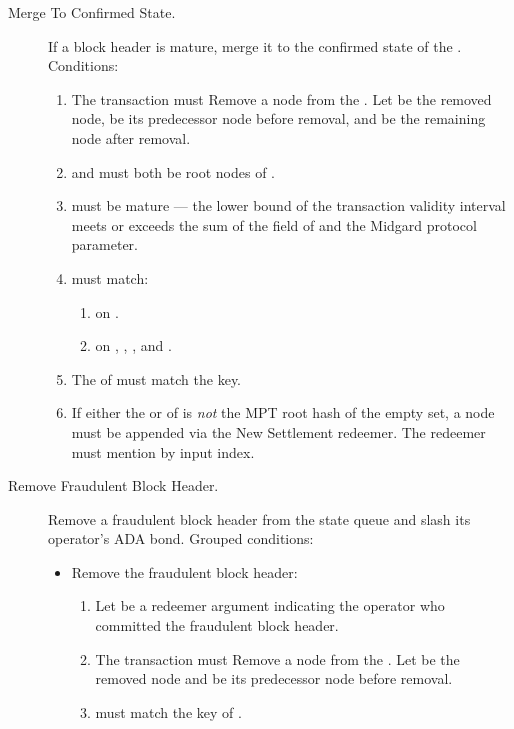 \documentclass[../midgard.tex]{subfiles}
\begin{document}
\begin{description}
    \item[Merge To Confirmed State.] If a block header is mature, merge it to the confirmed state of the .
      Conditions:
    \begin{enumerate}
        \item The transaction must Remove a node from the .
          Let  be the removed node,  be its predecessor node before removal, and  be the remaining node after removal.
        \item {} and  must both be root nodes of .
        \item {} must be mature --- the lower bound of the transaction validity interval meets or exceeds the sum of the  field of  and the Midgard  protocol parameter.
        \item {} must match:
          \begin{enumerate}
            \item {} on .
            \item {} on , , , and .
          \end{enumerate}
        \item The  of  must match the  key.
        \item If either the  or  of  is \emph{not} the MPT root hash of the empty set, a  node must be appended via the New Settlement redeemer.
          The redeemer must mention  by input index.
    \end{enumerate}

    \item[Remove Fraudulent Block Header.] Remove a fraudulent block header from the state queue and slash its operator's ADA bond.
      Grouped conditions:
    \begin{itemize}
        \item Remove the fraudulent block header:
        \begin{enumerate}
            \item Let  be a redeemer argument indicating the operator who committed the fraudulent block header.
            \item The transaction must Remove a node from the .
              Let  be the removed node and  be its predecessor node before removal.
            \item {} must match the key of .
        \end{enumerate}


\end{itemize}
\end{description}
\end{document}
